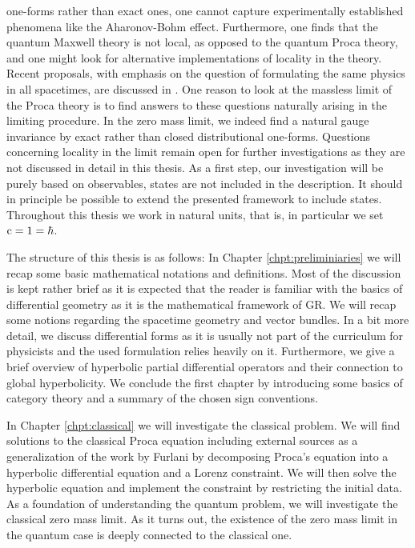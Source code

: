 one-forms rather than exact ones, one cannot capture experimentally established phenomena like the Aharonov-Bohm effect. Furthermore, one finds that the quantum Maxwell theory is not local, as opposed to the quantum Proca theory, and one might look for alternative implementations of locality in the theory. Recent proposals, with emphasis on the question of formulating the same physics in all spacetimes, are discussed in \cite{Fewster2012, Fewster2016}.
One reason to look at the massless limit of the Proca theory is to find answers to these questions naturally arising in the limiting procedure. In the zero mass limit, we indeed find a natural gauge invariance by exact rather than closed distributional one-forms. Questions concerning locality in the limit remain open for further investigations as they are not discussed in detail in this thesis. As a first step, our investigation will be purely based on observables, states are not included in the description. It should in principle be possible to extend the presented framework to include states. Throughout this thesis we work in natural units, that is, in particular we set $\text c = 1 = \hbar$.\par
%
%
%
The structure of this thesis is as follows:
In Chapter \ref{chpt:preliminiaries} we will recap some basic mathematical notations and definitions. Most of the discussion is kept rather brief as it is expected that the reader is familiar with the basics of differential geometry as it is the mathematical framework of GR. We will recap some notions regarding the spacetime geometry and vector bundles. In a bit more detail, we discuss differential forms as it is usually not part of the curriculum for physicists and the used formulation relies heavily on it. Furthermore, we give a brief overview of hyperbolic partial differential operators and their connection to global hyperbolicity. We conclude the first chapter by introducing some basics of category theory and a summary of the chosen sign conventions. \par
In Chapter \ref{chpt:classical} we will investigate the classical problem. We will find solutions to the classical Proca equation including external sources as a generalization of the work by Furlani \cite{FURLANI} by decomposing Proca's equation into a hyperbolic differential equation and a Lorenz constraint. We will then solve the hyperbolic equation and implement the constraint by restricting the initial data. As a foundation of understanding the quantum problem, we will investigate the classical zero mass limit. As it turns out, the existence of the zero mass limit in the quantum case is deeply connected to the classical one. \par
